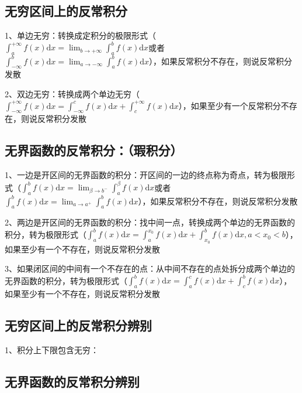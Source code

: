 \subsection{无穷区间上的反常积分}

1、单边无穷：转换成定积分的极限形式（$\int_{a}^{+\infty} f(x) \mathrm{d} x=\lim _{b \rightarrow+\infty} \int_{a}^{b} f(x) \mathrm{d} x$或者$\int_{-\infty}^{b} f(x) \mathrm{d} x=\lim _{a \rightarrow-\infty} \int_{a}^{b} f(x) \mathrm{d} x$），如果反常积分不存在，则说反常积分发散

2、双边无穷：转换成两个单边无穷（$\int_{-\infty}^{+\infty} f(x) \mathrm{d} x=\int_{-\infty}^{c} f(x) \mathrm{d} x+\int_{c}^{+\infty} f(x) \mathrm{d} x$），如果至少有一个反常积分不存在，则说反常积分发散



\subsection{无界函数的反常积分：（瑕积分）}

1、一边是开区间的无界函数的积分：开区间的一边的终点称为奇点，转为极限形式（$\int_{a}^{b} f(x) \mathrm{d} x=\lim _{\beta \rightarrow b^{-}} \int_{a}^{\beta} f(x) \mathrm{d} x$或者$\int_{a}^{b} f(x) \mathrm{d} x=\lim _{a \rightarrow a^{+}} \int_{a}^{b} f(x) \mathrm{d} x$），如果反常积分不存在，则说反常积分发散

2、两边是开区间的无界函数的积分：找中间一点，转换成两个单边的无界函数的积分，转为极限形式（$\int_{a}^{b} f(x) \mathrm{d} x=\int_{a}^{x_{0}} f(x) \mathrm{d} x+\int_{x_{0}}^{b} f(x) \mathrm{d} x, a<x_{0}<b$），如果至少有一个不存在，则说反常积分发散

3、如果闭区间的中间有一个不存在的点：从中间不存在的点处拆分成两个单边的无界函数的积分，转为极限形式（$\int_{a}^{b} f(x) \mathrm{d} x=\int_{a}^{c} f(x) \mathrm{d} x+\int_{c}^{b} f(x) \mathrm{d} x$），如果至少有一个不存在，则说反常积分发散



\subsection{无穷区间上的反常积分辨别}

1、积分上下限包含无穷：



\subsection{无界函数的反常积分辨别}

